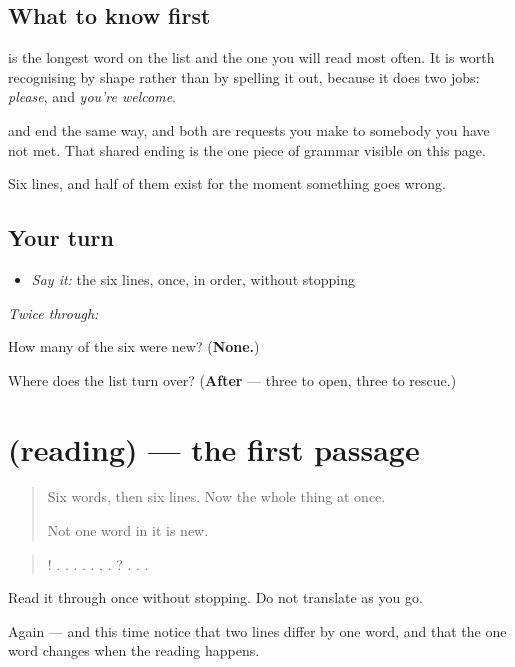 \subsection*{What to know first}
\textbf{} is the longest word on the list and the one you will read most often. It is worth recognising by shape rather than by spelling it out, because it does two jobs: \emph{please}, and \emph{you're welcome}.

\textbf{} and \textbf{} end the same way, and both are requests you make to somebody you have not met. That shared ending is the one piece of grammar visible on this page.

Six lines, and half of them exist for the moment something goes wrong.

\subsection*{Your turn}
\begin{itemize}
\raggedright
  \item \emph{Say it:} the six lines, once, in order, without stopping
\end{itemize}

\emph{Twice through:}

\begin{tcolorbox}[breakable,colback=teal!4,colframe=teal!35!black,title={Before you move on}]
How many of the six were new? (\textbf{None.})

Where does the list turn over? (\textbf{After } — three to open, three to rescue.)
\end{tcolorbox}
\section[(reading)]{(reading) — the first passage}

\label{lesson:RU-C27-pervoe-chtenie}



\begin{quote}
Six words, then six lines. Now the whole thing at once.

Not one word in it is new.
\end{quote}

\begin{tcolorbox}[breakable,skin=enhanced,colback=orange!6,colframe=orange!45!black,boxrule=0.5pt,arc=1mm,left=6pt,right=6pt,top=4pt,bottom=4pt,fonttitle=\bfseries,title={Read this}]
\begin{quote}
!   .   .  .  .   . ,   .   ?   . .  .
\end{quote}

Read it through once without stopping. Do not translate as you go.

Again — and this time notice that two lines differ by one word, and that the one word changes when the reading happens.
\end{tcolorbox}

